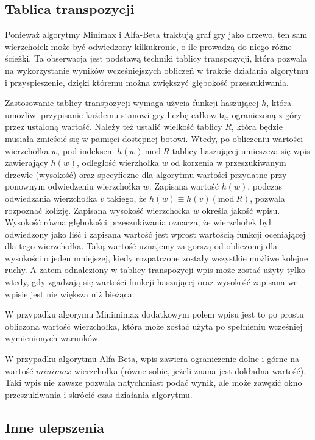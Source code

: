 \documentclass{pracamgr}
\begin{document}
\subsection{Tablica transpozycji}

Ponieważ algorytmy Minimax i Alfa-Beta traktują graf gry jako drzewo, ten sam wierzchołek może być odwiedzony kilkukronie, o ile prowadzą do niego różne ścieżki.
Ta obserwacja jest podstawą techniki tablicy transpozycji, która pozwala na wykorzystanie wyników wcześniejszych obliczeń w trakcie działania algorytmu i przyspieszenie, dzięki któremu można zwiększyć głębokość przeszukiwania.

Zastosowanie tablicy transpozycji wymaga użycia funkcji haszującej \(h\), która umożliwi przypisanie każdemu stanowi gry liczbę całkowitą, ograniczoną z góry przez ustaloną wartość.
Należy też ustalić wielkość tablicy \(R\), która będzie musiała zmieścić się w pamięci dostępnej botowi.
Wtedy, po obliczeniu wartości wierzchołka \(w\), pod indeksem \(h(w)\ \textrm{mod}\ R\) tablicy haszującej umieszcza się wpis zawierający \(h(w)\), odległość wierzhołka \(w\) od korzenia w przeszukiwanym drzewie (wysokość) oraz specyficzne dla algorytmu wartości przydatne przy ponownym odwiedzeniu wierzchołka \(w\).
Zapisana wartość \(h(w)\), podczas odwiedzania wierzchołka \(v\) takiego, że \(h(w) \equiv h(v) (\textrm{mod}\ R)\), pozwala rozpoznać kolizję.
Zapisana wysokość wierzchołka \(w\) określa jakość wpisu.
Wysokość równa głębokości przeszukiwania oznacza, że wierzchołek był odwiedzony jako liść i zapisana wartość jest wprost wartością funkcji oceniającej dla tego wierzchołka.
Taką wartość uznajemy za gorszą od obliczonej dla wysokości o jeden mniejszej, kiedy rozpatrzone zostały wszystkie możliwe kolejne ruchy.
A zatem odnaleziony w tablicy transpozycji wpis może zostać użyty tylko wtedy, gdy zgadzają się wartości funkcji haszującej oraz wysokość zapisana we wpisie jest nie większa niż bieżąca.

W przypadku algorymu Minimimax dodatkowym polem wpisu jest to po prostu obliczona wartość wierzchołka, która może zostać użyta po spełnieniu wcześniej wymienionych warunków.

W przypadku algorytmu Alfa-Beta, wpis zawiera ograniczenie dolne i górne na wartość \(minimax\) wierzchołka (równe sobie, jeżeli znana jest dokładna wartość).
Taki wpis nie zawsze pozwala natychmiast podać wynik, ale może zawęzić okno przeszukiwania i skrócić czas działania algorytmu.

\subsection{Inne ulepszenia}
\end{document}

